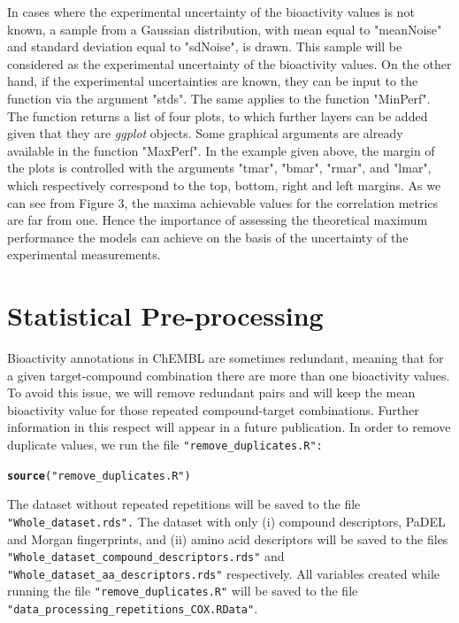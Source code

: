 \documentclass[twoside,a4wide,12pt]{article}\usepackage[]{graphicx}\usepackage[]{color}
\makeatletter
\newcommand{\hlstr}[1]{\textcolor[rgb]{0.192,0.494,0.8}{#1}}%
\newcommand{\hlstd}[1]{\textcolor[rgb]{0.345,0.345,0.345}{#1}}%
\newcommand{\hlkwd}[1]{\textcolor[rgb]{0.737,0.353,0.396}{\textbf{#1}}}%
\newenvironment{kframe}{%
 \def\at@end@of@kframe{}%
 \ifinner\ifhmode%
  \def\at@end@of@kframe{\end{minipage}}%
  \begin{minipage}{\columnwidth}%
 \fi\fi%
 \def\FrameCommand##1{\hskip\@totalleftmargin \hskip-\fboxsep
 \colorbox{shadecolor}{##1}\hskip-\fboxsep
     \hskip-\linewidth \hskip-\@totalleftmargin \hskip\columnwidth}%
 \MakeFramed {\advance\hsize-\width
   \@totalleftmargin\z@ \linewidth\hsize
   \@setminipage}}%
 {\par\unskip\endMakeFramed%
 \at@end@of@kframe}
\newenvironment{knitrout}{}{} %
\makeatother
\begin{document}
In cases where the experimental uncertainty of the bioactivity values is not known, 
a sample from a Gaussian distribution,
with mean equal to "meanNoise" and standard deviation equal to "sdNoise",
is drawn. 
This sample will be considered as the experimental uncertainty of the bioactivity values.
On the other hand, if the experimental uncertainties are known, they can be input to the function via the argument 
"stds". 
The same applies to the function "MinPerf".
The function returns a list of four plots, to which further layers can be added given that they are {\it ggplot} objects.
Some graphical arguments are already available in the function "MaxPerf".
In the example given above, the margin of the plots is controlled with the arguments "tmar", "bmar", "rmar", and "lmar",
which respectively correspond to the top, bottom, right and left margins.
As we can see from Figure 3, the maxima achievable values for the correlation metrics are far from one.
Hence the importance of assessing the theoretical maximum performance the models can achieve on the basis of the uncertainty of the experimental measurements.

\section{Statistical Pre-processing}
Bioactivity annotations in ChEMBL are sometimes redundant, 
meaning that for a given target-compound combination there are more than one bioactivity values.
To avoid this issue, we will remove redundant pairs and will keep the mean bioactivity value for those repeated compound-target combinations.
Further information in this respect will appear in a future publication.
In order to remove duplicate values, we run the file \verb|"remove_duplicates.R":|
\begin{knitrout}
\color{fgcolor}\begin{kframe}
\begin{alltt}
\hlkwd{source}\hlstd{(}\hlstr{"remove_duplicates.R"}\hlstd{)}
\end{alltt}
\end{kframe}
\end{knitrout}
The dataset without repeated repetitions will be saved to the file \verb|"Whole_dataset.rds".|
The dataset with only (i) compound descriptors, PaDEL and Morgan fingerprints, and (ii) amino acid descriptors
will be saved to the files \verb|"Whole_dataset_compound_descriptors.rds"| and \verb|"Whole_dataset_aa_descriptors.rds"|
respectively. All variables created while running the file \verb|"remove_duplicates.R"| will be saved to the file\\
\verb|"data_processing_repetitions_COX.RData"|.
\end{document}
